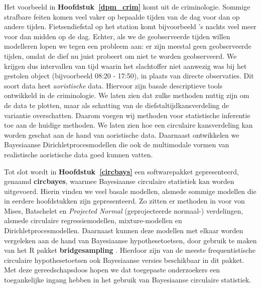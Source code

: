 \documentclass[12pt, a4paper]{book}\usepackage[]{graphicx}\usepackage{xcolor}
\let\proglang=\textsf
\newcommand{\pkg}[1]{\textbf{#1}}
\begin{document}
Het voorbeeld in \textbf{Hoofdstuk~\ref{dpm_crim}} komt uit de criminologie. Sommige strafbare feiten komen veel vaker op bepaalde tijden van de dag voor dan op andere tijden. Fietsendiefstal op het station komt bijvoorbeeld 's nachts veel meer voor dan midden op de dag. Echter, als we de geobserveerde tijden willen modelleren lopen we tegen een probleem aan: er zijn meestal geen geobserveerde tijden, omdat de dief nu juist probeert om niet te worden geobserveerd. We krijgen dus intervallen van tijd waarin het slachtoffer niet aanwezig was bij het gestolen object (bijvoorbeeld 08:20 - 17:50), in plaats van directe observaties. Dit soort data heet \textit{aoristische} data. Hiervoor zijn basale descriptieve tools ontwikkeld \citep{ashby2013comparison} in de criminologie. We laten zien dat zulke methoden nuttig zijn om de data te plotten, maar als schatting van de diefstaltijdkansverdeling de variantie overschatten. Daarom voegen wij methoden  voor statistische inferentie toe aan de huidige methoden. We laten zien hoe een circulaire kansverdeling kan worden geschat aan de hand van aoristische data. Daarnaast ontwikkelen we Bayesiaanse Dirichletprocesmodellen die ook de multimodale vormen van realistische aoristische data goed kunnen vatten.

Tot slot wordt in \textbf{Hoofdstuk~\ref{circbays}} een softwarepakket gepresenteerd, genaamd \pkg{circbayes}, waarmee Bayesiaanse circulaire statistiek kan worden uitgevoerd. Hierin vinden we veel basale modellen, alsmede sommige modellen die in eerdere hoofdstukken zijn gepresenteerd. Zo zitten er methoden in voor von Mises, Batschelet en \textit{Projected Normal} (geprojecteerde normaal-) verdelingen, alsmede circulaire regressiemodellen, mixture-modellen en Dirichletprocesmodellen. Daarnaast kunnen deze modellen met elkaar worden vergeleken aan de hand van Bayesiaanse hypothesetoetsen, door gebruik te maken van het \proglang{R} pakket \pkg{bridgesampling} \citep{gronau2017bridgesampling}. Hierdoor zijn van de meeste frequentistische circulaire hypothesetoetsen ook Bayesiaanse versies beschikbaar in dit pakket. Met deze gereedschapsdoos hopen we dat toegepaste onderzoekers een toegankelijke ingang hebben in het gebruik van Bayesiaanse circulaire statistiek.




\end{document}
